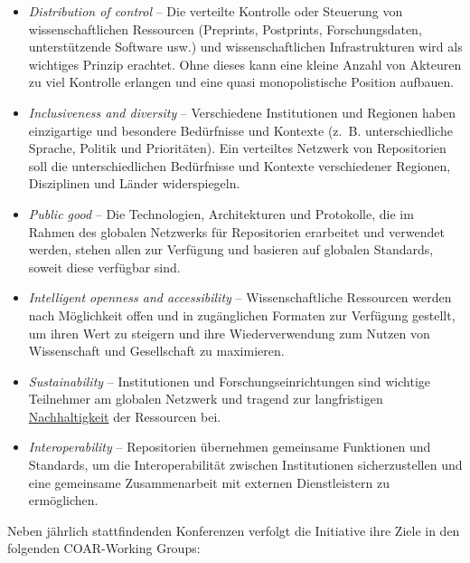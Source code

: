 \documentclass{article}
\begin{document}
        \begin{itemize}\item {\emph{Distribution of control} – Die verteilte Kontrolle oder
                     Steuerung von wissenschaftlichen Ressourcen (Preprints, Postprints,
                     Forschungsdaten, unterstützende Software usw.) und wissenschaftlichen
                     Infrastrukturen wird als wichtiges Prinzip erachtet. Ohne dieses kann eine
                     kleine Anzahl von Akteuren zu viel Kontrolle erlangen und eine quasi
                     monopolistische Position aufbauen.}\item {\emph{Inclusiveness and diversity} – Verschiedene Institutionen
                     und Regionen haben einzigartige und besondere Bedürfnisse und Kontexte (z. B.
                     unterschiedliche Sprache, Politik und Prioritäten). Ein verteiltes Netzwerk von
                     Repositorien soll die unterschiedlichen Bedürfnisse und Kontexte verschiedener
                     Regionen, Disziplinen und Länder widerspiegeln.}\item {\emph{Public good} – Die Technologien, Architekturen und
                     Protokolle, die im Rahmen des globalen Netzwerks für Repositorien erarbeitet
                     und verwendet werden, stehen allen zur Verfügung und basieren auf globalen
                     Standards, soweit diese verfügbar sind.}\item {\emph{Intelligent openness and accessibility} –
                     Wissenschaftliche Ressourcen werden nach Möglichkeit offen und in zugänglichen
                     Formaten zur Verfügung gestellt, um ihren Wert zu steigern und ihre
                     Wiederverwendung zum Nutzen von Wissenschaft und Gesellschaft zu
                     maximieren.}\item {\emph{Sustainability} – Institutionen und
                     Forschungseinrichtungen sind wichtige Teilnehmer am globalen Netzwerk und
                     tragend zur langfristigen \href{http://gams.uni-graz.at/o:konde.6}{Nachhaltigkeit} der Ressourcen
                     bei.}\item {\emph{Interoperability} – Repositorien übernehmen gemeinsame
                     Funktionen und Standards, um die Interoperabilität zwischen Institutionen
                     sicherzustellen und eine gemeinsame Zusammenarbeit mit externen Dienstleistern
                     zu ermöglichen.}\end{itemize}Neben jährlich stattfindenden Konferenzen verfolgt die Initiative ihre Ziele in
                  den folgenden COAR-Working Groups:\\
            
\end{document}
